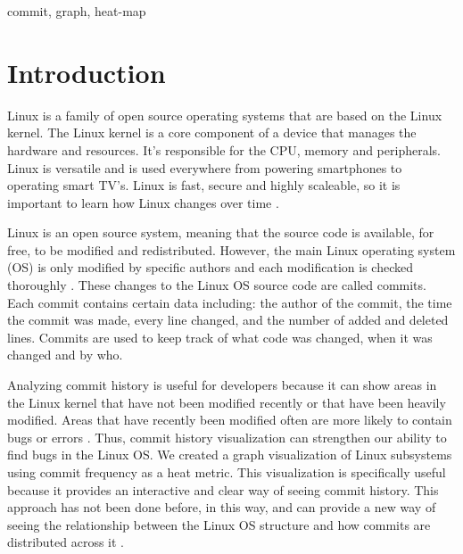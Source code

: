 \documentclass[conference]{IEEEtran}
\begin{document}
\begin{IEEEkeywords}
commit, graph, heat-map
\end{IEEEkeywords}

\section{Introduction}
\label{intro}
Linux is a family of open source operating systems that are based on the Linux kernel. The Linux kernel is a core component of a device that manages the hardware and resources. It's responsible for the CPU, memory and peripherals. Linux is versatile and is used everywhere from powering smartphones to operating smart TV's. Linux is fast, secure and highly scaleable, so it is important to learn how Linux changes over time \cite{love2010linux}.%

Linux is an open source system, meaning that the source code is available, for free, to be modified and redistributed. However, the main Linux operating system (OS) is only modified by specific authors and each modification is checked thoroughly \cite{ISRAELI}. These changes to the Linux OS source code are called commits. Each commit contains certain data including: the author of the commit, the time the commit was made, every line changed, and the number of added and deleted lines. Commits are used to keep track of what code was changed, when it was changed and by who. %



Analyzing commit history is useful for developers because it can show areas in the Linux kernel that have not been modified recently or that have been heavily modified. Areas that have recently been modified often are more likely to contain bugs or errors \cite{prade}. Thus, commit history visualization can strengthen our ability to find bugs in the Linux OS. We created a graph visualization of Linux subsystems using commit frequency as a heat metric. This visualization is specifically useful because it provides an interactive and clear way of seeing commit history. This approach has not been done before, in this way, and can provide a new way of seeing the relationship between the Linux OS structure and how commits are distributed across it \cite{peru}. %
\end{document}
